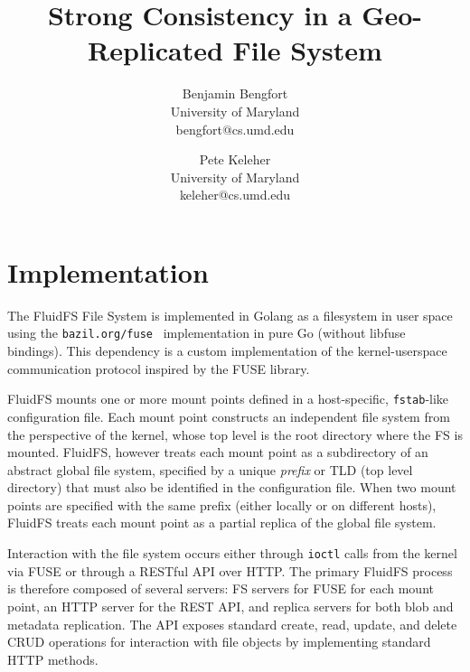 \documentclass[letterpaper,twocolumn,10pt]{article}
\begin{document}
\date{}

\title{\Large \bf Strong Consistency in a Geo-Replicated File System}

\author{
{\rm Benjamin Bengfort}\\
University of Maryland\\
bengfort@cs.umd.edu
\and
{\rm Pete Keleher}\\
University of Maryland\\
keleher@cs.umd.edu
} %

\maketitle




\section*{Implementation}

The FluidFS File System is implemented in Golang as a filesystem in user
space~\cite{vangoor_fuse_2017} using the \texttt{bazil.org/fuse}~\cite{virtanen_bazil.org/fuse_2016} implementation in pure Go
(without libfuse bindings).
This dependency is a custom implementation of the kernel-userspace
communication protocol inspired by the FUSE library.

FluidFS mounts one or more mount points defined in a host-specific,
\texttt{fstab}-like configuration file.
Each mount point constructs an independent file system from the perspective
of the kernel, whose top level is the root directory where the FS is mounted.
FluidFS, however treats each mount point as a subdirectory of an abstract
global file system, specified by a unique \textit{prefix} or TLD (top level
directory) that must also be identified in the configuration file.
When two mount points are specified with the same prefix (either locally or
on different hosts), FluidFS treats each mount point as a partial replica of
the global file system.

Interaction with the file system occurs either through \texttt{ioctl} calls
from the kernel via FUSE or through a RESTful API over HTTP.
The primary FluidFS process is therefore composed of several servers: FS
servers for FUSE for each mount point, an HTTP server for the REST API, and
replica servers for both blob and metadata replication.
The API exposes standard create, read, update, and delete CRUD operations for interaction with file objects by implementing standard HTTP methods.
\end{document}
